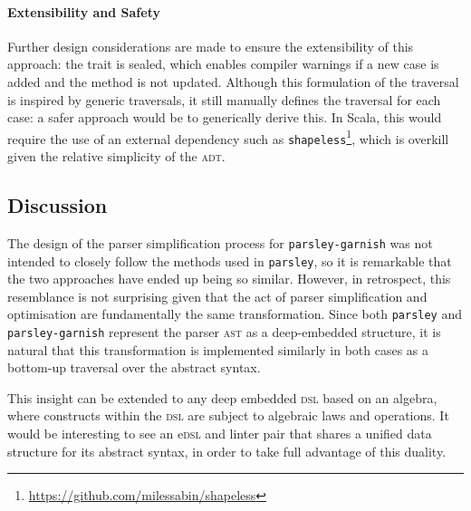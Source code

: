 \documentclass[../../../main.tex]{subfiles}
\begin{document}
\paragraph{Extensibility and Safety}
Further design considerations are made to ensure the extensibility of this approach: the  trait is sealed, which enables compiler warnings if a new  case is added and the  method is not updated.
Although this formulation of the traversal is inspired by generic traversals, it still manually defines the traversal for each case: a safer approach would be to generically derive this.
In Scala, this would require the use of an external dependency such as \texttt{shapeless}\footnote{\url{https://github.com/milessabin/shapeless}},
which is overkill given the relative simplicity of the  \textsc{adt}.

\subsection*{Discussion}
The design of the parser simplification process for \texttt{parsley-garnish} was not intended to closely follow the methods used in \texttt{parsley}, so it is remarkable that the two approaches have ended up being so similar.
However, in retrospect, this resemblance is not surprising given that the act of parser simplification and optimisation are fundamentally the same transformation.
Since both \texttt{parsley} and \texttt{parsley-garnish} represent the parser \textsc{ast} as a deep-embedded structure, it is natural that this transformation is implemented similarly in both cases as a bottom-up traversal over the abstract syntax.

This insight can be extended to any deep embedded \textsc{dsl} based on an algebra, where constructs within the \textsc{dsl} are subject to algebraic laws and operations.
It would be interesting to see an e\textsc{dsl} and linter pair that shares a unified data structure for its abstract syntax, in order to take full advantage of this duality.
\end{document}
